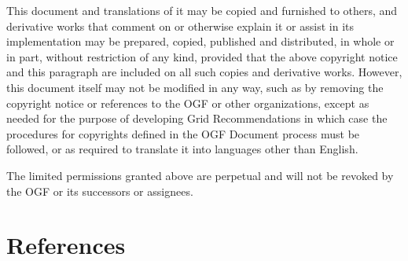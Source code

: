\documentclass[12pt]{article}  %
\begin{document}
This document and translations of it may be copied and furnished to others,
and derivative works that comment on or otherwise explain it or assist in its
implementation may be prepared, copied, published and distributed, in whole
or in part, without restriction of any kind, provided that the above
copyright notice and this paragraph are included on all such copies and
derivative works. However, this document itself may not be modified in any
way, such as by removing the copyright notice or references to the OGF or
other organizations, except as needed for the purpose of developing Grid
Recommendations in which case the procedures for copyrights defined in the
OGF Document process must be followed, or as required to translate it into
languages other than English.

The limited permissions granted above are perpetual and will not be revoked 
by the OGF or its successors or assignees.


\section*{References}
% 
\renewcommand{\refname}{}

\end{document}
